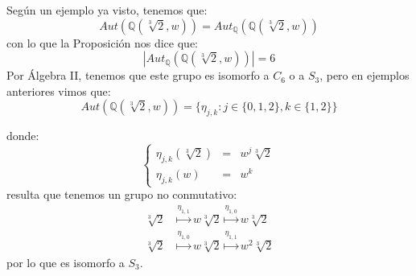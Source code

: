 \begin{ejemplo}
    Según un ejemplo ya visto, tenemos que:
    \begin{equation*}
        Aut\left(\mathbb{Q}\left(\sqrt[3]{2}, w\right)\right) = Aut_\mathbb{Q}\left(\mathbb{Q}\left(\sqrt[3]{2}, w\right)\right)
    \end{equation*}
    con lo que la Proposición nos dice que:
    \begin{equation*}
        \left|Aut_\mathbb{Q}\left(\mathbb{Q}\left(\sqrt[3]{2},w\right)\right)\right| = 6
    \end{equation*}
    Por Álgebra II, tenemos que este grupo es isomorfo a $C_6$ o a $S_3$, pero en ejemplos anteriores vimos que:
    \begin{equation*}
        Aut\left(\mathbb{Q}\left(\sqrt[3]{2},w\right)\right) = \{\eta_{j,k} : j \in \{0,1,2\}, k\in \{1,2\}\}
    \end{equation*}

    donde:
    \begin{equation*}
        \left\{\begin{array}{ccl}
                \eta_{j,k}\left(\sqrt[3]{2}\right) &=& w^j\sqrt[3]{2} \\
                \eta_{j,k}(w) &=& w^k
        \end{array}\right.
    \end{equation*}
    resulta que tenemos un grupo no conmutativo:
    \begin{align*}
        \sqrt[3]{2} &\stackrel{\eta_{1,1}}{\longmapsto} w\sqrt[3]{2} \stackrel{\eta_{1,0}}{\longmapsto} w\sqrt[3]{2} \\
        \sqrt[3]{2} &\stackrel{\eta_{1,0}}{\longmapsto} w\sqrt[3]{2} \stackrel{\eta_{1,1}}{\longmapsto} w^2\sqrt[3]{2} 
    \end{align*}
    por lo que es isomorfo a $S_3$.
\end{ejemplo}

